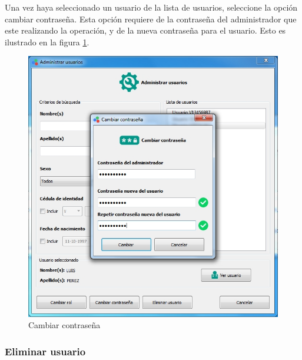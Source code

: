 		Una vez haya seleccionado un usuario de la lista de usuarios, seleccione la opci\'{o}n cambiar contrase\~{n}a. Esta opci\'{o}n requiere de la contrase\~{n}a del administrador que este realizando la operaci\'{o}n, y de la nueva contrase\~{n}a para el usuario. Esto es ilustrado en la figura \ref{fig:cambiar-clave2}.
\vfill
\begin{figure}[H]
  \centering
  \includegraphics[width=1\linewidth]{./img/administrar-clave.jpg}
\caption[]{Cambiar contrase\~{n}a\label{fig:cambiar-clave2}}
\end{figure}
\vfill
\newpage
		\subsubsection*{Eliminar usuario}
		
